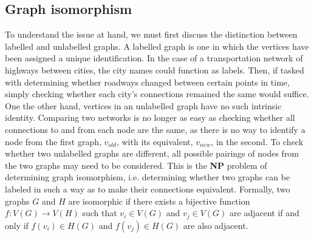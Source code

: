 \documentclass[11pt]{article}
\begin{document}
\subsection{Graph isomorphism}
\indent To understand the issue at hand, we must first discuss the distinction between labelled and unlabelled graphs. A labelled graph is one in which the vertices have been assigned a unique identification. In the case of a transportation network of highways between cities, the city names could function as labels. Then, if tasked with determining whether roadways changed between certain points in time, simply checking whether each city's connections remained the same would suffice. One the other hand, vertices in an unlabelled graph have no such intrinsic identity. Comparing two networks is no longer as easy as checking whether all connections to and from each node are the same, as there is no way to identify a node from the first graph, $v_{old}$, with its equivalent, $v_{new}$, in the second. To check whether two unlabelled graphs are different, all possible pairings of nodes from the two graphs may need to be considered. This is the \textbf{NP} problem of determining graph isomorphism, i.e. determining whether two graphs can be labeled in such a way as to make their connections equivalent. Formally, two graphs $G$ and $H$ are isomorphic if there exists a bijective function $f:V(G) \rightarrow V(H)$ such that $v_{i} \in V(G)$ and $v_{j} \in V(G)$ are adjacent if and only if $f(v_{i}) \in H(G)$ and $f(v_{j}) \in H(G)$ are also adjacent. \vspace{1mm}
\end{document}
